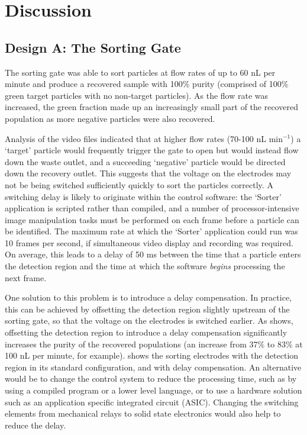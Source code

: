 \section{Discussion}

\subsection{Design A: The Sorting Gate}

The sorting gate was able to sort particles at flow rates of up to 60 nL per minute and produce a recovered sample with 100\% purity (comprised of 100\% green target particles with no non-target particles). As the flow rate was increased, the green fraction made up an increasingly small part of the recovered population as more negative particles were also recovered. 

Analysis of the video files indicated that at higher flow rates (70-100 nL min$^{-1}$) a `target' particle would frequently trigger the gate to open but would instead flow down the waste outlet, and a succeeding `negative' particle would be directed down the recovery outlet. This suggests that the voltage on the electrodes may not be being switched sufficiently quickly to sort the particles correctly. A switching delay is likely to originate within the control software: the `Sorter' application is scripted rather than compiled, and a number of processor-intensive image manipulation tasks must be performed on each frame before a particle can be identified. The maximum rate at which the `Sorter' application could run was 10 frames per second, if simultaneous video display and recording was required. On average, this leads to a delay of 50 ms between the time that a particle enters the detection region and the time at which the software \textit{begins} processing the next frame. 

One solution to this problem is to introduce a delay compensation. In practice, this can be achieved by offsetting the detection region slightly upstream of the sorting gate, so that the voltage on the electrodes is switched earlier. As  shows, offsetting the detection region to introduce a delay compensation significantly increases the purity of the recovered populations (an increase from 37\% to 83\% at 100 nL per minute, for example).  shows the sorting electrodes with the detection region in its standard configuration, and with delay compensation. An alternative would be to change the control system to reduce the processing time, such as by using a compiled program or a lower level language, or to use a hardware solution such as an application specific integrated circuit (ASIC). Changing the switching elements from mechanical relays to solid state electronics would also help to reduce the delay.

